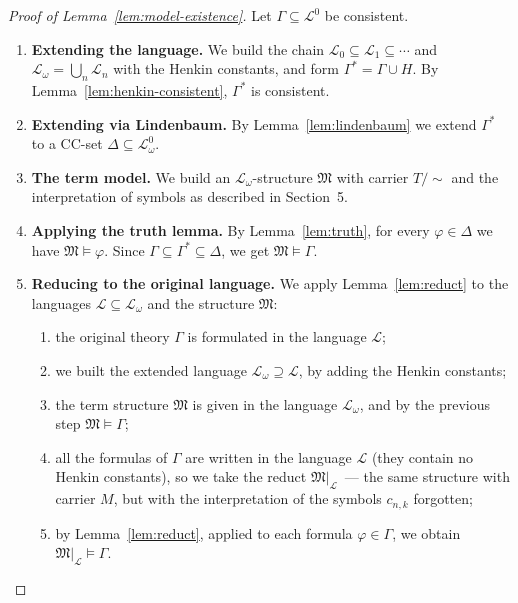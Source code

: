 \documentclass[12pt, a4paper]{article}
\theoremstyle{plain}
\theoremstyle{definition}
\renewcommand{\models}{\vDash}
\newcommand{\Lang}{\mathcal{L}}
\newcommand{\Lw}{\mathcal{L}_\omega}
\newcommand{\Struct}{\mathfrak{M}}
\begin{document}
\begin{proof}[Proof of Lemma~\ref{lem:model-existence}]
Let $\Gamma \subseteq \Lang^0$ be consistent.

\begin{enumerate}[label=\textbf{Step \arabic*.}, leftmargin=*, itemsep=4pt]
  \item \textbf{Extending the language.}
        We build the chain $\Lang_0 \subseteq \Lang_1 \subseteq \cdots$
        and $\Lw = \bigcup_n \Lang_n$ with the Henkin constants,
        and form $\Gamma^* = \Gamma \cup H$.
        By Lemma~\ref{lem:henkin-consistent}, $\Gamma^*$ is consistent.

  \item \textbf{Extending via Lindenbaum.}
        By Lemma~\ref{lem:lindenbaum} we extend $\Gamma^*$
        to a CC-set $\Delta \subseteq \Lw^0$.

  \item \textbf{The term model.}
        We build an $\Lw$-structure $\Struct$ with carrier $T/{\sim}$
        and the interpretation of symbols as described in Section~5.

  \item \textbf{Applying the truth lemma.}
        By Lemma~\ref{lem:truth}, for every $\varphi \in \Delta$
        we have $\Struct \models \varphi$.
        Since $\Gamma \subseteq \Gamma^* \subseteq \Delta$,
        we get $\Struct \models \Gamma$.

  \item \textbf{Reducing to the original language.}
        We apply Lemma~\ref{lem:reduct} to the languages $\Lang \subseteq \Lw$ and
        the structure $\Struct$:
        \begin{enumerate}[label=(\alph*)]
          \item the original theory $\Gamma$ is formulated in the language $\Lang$;
          \item we built the extended language $\Lw \supseteq \Lang$,
                by adding the Henkin constants;
          \item the term structure $\Struct$ is given in the language $\Lw$, and
                by the previous step $\Struct \models \Gamma$;
          \item all the formulas of $\Gamma$ are written in the language $\Lang$ (they contain
                no Henkin constants), so we take the reduct
                $\Struct|_{\Lang}$~--- the same structure with carrier $M$,
                but with the interpretation of the symbols $c_{n,k}$ forgotten;
          \item by Lemma~\ref{lem:reduct}, applied to each formula
                $\varphi \in \Gamma$, we obtain $\Struct|_{\Lang} \models \Gamma$.
        \end{enumerate}
\end{enumerate}
\end{proof}
\end{document}
